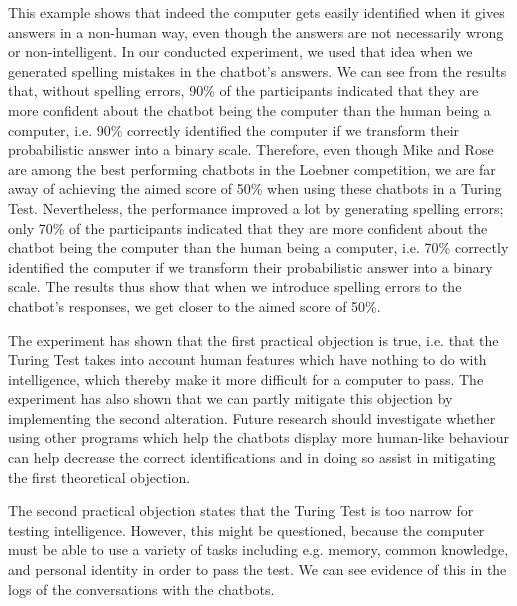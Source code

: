 This example shows that indeed the computer gets easily identified when it gives answers in a non-human way, even though the answers are not necessarily wrong or non-intelligent. In our conducted experiment, we used that idea when we generated spelling mistakes in the chatbot’s answers. We can see from the results that, without spelling errors, 90\% of the participants indicated that they are more confident about the chatbot being the computer than the human being a computer, i.e. 90\% correctly identified the computer if we transform their probabilistic answer into a binary scale. Therefore, even though Mike and Rose are among the best performing chatbots in the Loebner competition, we are far away of achieving the aimed score of 50\% when using these chatbots in a Turing Test. Nevertheless, the performance improved a lot by generating spelling errors; only 70\% of the participants  indicated that they are more confident about the chatbot being the computer than the human being a computer, i.e. 70\% correctly identified the computer if we transform their probabilistic answer into a binary scale. The results thus show that when we introduce spelling errors to the chatbot’s responses, we get closer to the aimed score of 50\%.

The experiment has shown that the first practical objection is true, i.e. that the Turing Test takes into account human features which have nothing to do with intelligence, which thereby make it more difficult for a computer to pass. The experiment has also shown that we can partly mitigate this objection by implementing the second alteration. Future research should investigate whether using other programs which help the chatbots display more human-like behaviour can help decrease the correct identifications and in doing so assist in mitigating the first theoretical objection.

The second practical objection states that the Turing Test is too narrow for testing intelligence. However, this might be questioned, because the computer must be able to use a variety of tasks including e.g. memory, common knowledge, and personal identity in order to pass the test. We can see evidence of this in the logs of the conversations with the chatbots.

\begin{figure}[ht]
   \begin{center}
   \end{center}
   \caption{}
   \label{Example5}
\end{figure}

